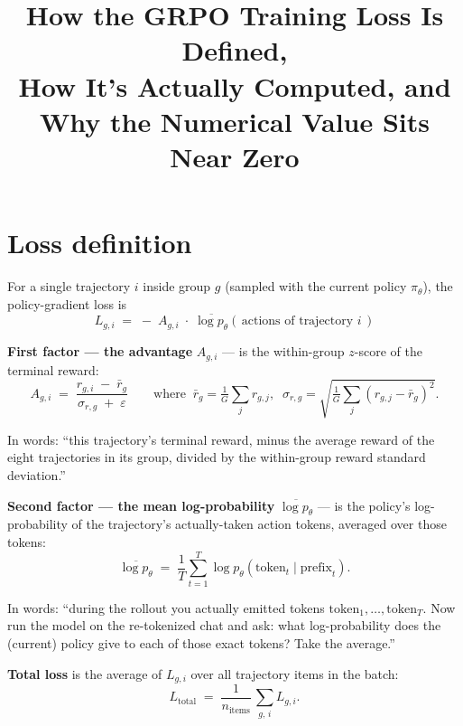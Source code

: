 \documentclass[11pt,a4paper]{article}
\title{\vspace{-1.5cm}\bfseries How the GRPO Training Loss Is Defined,\\
How It's Actually Computed, and Why the Numerical Value Sits Near Zero}
\author{}
\date{}
\begin{document}
\maketitle
\vspace{-1.5em}

\section{Loss definition}

For a single trajectory $i$ inside group $g$ (sampled with the current policy
$\pi_\theta$), the policy-gradient loss is
\begin{equation}
\boxed{\;\;
L_{g,i} \;=\; -\;A_{g,i}\;\cdot\;\overline{\log p_\theta}\!\left(\,\text{actions of trajectory }i\,\right)
\;\;}
\end{equation}

\textbf{First factor --- the advantage} $A_{g,i}$ --- is the within-group
$z$-score of the terminal reward:
\begin{equation}
A_{g,i} \;=\; \frac{r_{g,i} \;-\; \bar r_g}{\sigma_{r,g} \;+\; \varepsilon}
\qquad
\text{where}\;\; \bar r_g = \tfrac{1}{G}\sum_{j} r_{g,j},\;\;
\sigma_{r,g} = \sqrt{\tfrac{1}{G}\sum_j (r_{g,j} - \bar r_g)^2}.
\end{equation}

In words: ``this trajectory's terminal reward, minus the average reward of
the eight trajectories in its group, divided by the within-group reward
standard deviation.''

\textbf{Second factor --- the mean log-probability} $\overline{\log p_\theta}$
--- is the policy's log-probability of the trajectory's actually-taken
action tokens, averaged over those tokens:
\begin{equation}
\overline{\log p_\theta} \;=\; \frac{1}{T}\sum_{t=1}^{T} \log p_\theta\!\left(\text{token}_t \;\big|\; \text{prefix}_t\right).
\end{equation}

In words: ``during the rollout you actually emitted tokens
$\text{token}_1, \dots, \text{token}_T$. Now run the model on the
re-tokenized chat and ask: what log-probability does the (current) policy
give to each of those exact tokens? Take the average.''

\textbf{Total loss} is the average of $L_{g,i}$ over all trajectory items
in the batch:
\begin{equation}
L_{\text{total}} \;=\; \frac{1}{n_{\text{items}}}\,\sum_{g,\,i} L_{g,i}.
\end{equation}
\end{document}
